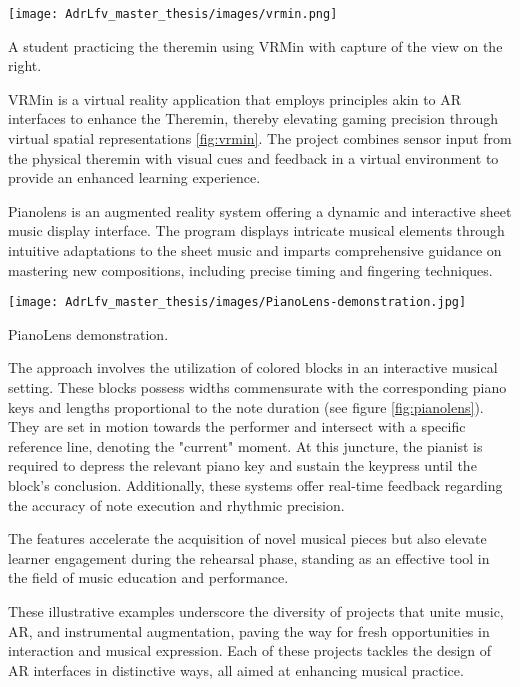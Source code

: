 \begin{marginfigure}
    \centering
    \texttt{[image: AdrLfv\_master\_thesis/images/vrmin.png]}
    \caption{A student practicing the theremin using VRMin with capture of the view on the right.}
    \label{fig:vrmin}
\end{marginfigure}

VRMin \cite{johnson2017vrmin} is a virtual reality application that employs principles akin to AR interfaces to enhance the Theremin, thereby elevating gaming precision through virtual spatial representations \ref{fig:vrmin}. The project combines sensor input from the physical theremin with visual cues and feedback in a virtual environment to provide an enhanced learning experience. 

Pianolens is an augmented reality system offering a dynamic and interactive sheet music display interface. The program displays intricate musical elements through intuitive adaptations to the sheet music and imparts comprehensive guidance on mastering new compositions, including precise timing and fingering techniques. 

\begin{marginfigure}
    \centering
    \texttt{[image: AdrLfv\_master\_thesis/images/PianoLens-demonstration.jpg]}
    \caption{PianoLens demonstration.}
    \label{fig:pianolens}
\end{marginfigure}

The approach involves the utilization of colored blocks in an interactive musical setting. These blocks possess widths commensurate with the corresponding piano keys and lengths proportional to the note duration (see figure \ref{fig:pianolens}). They are set in motion towards the performer and intersect with a specific reference line, denoting the "current" moment. At this juncture, the pianist is required to depress the relevant piano key and sustain the keypress until the block's conclusion. Additionally, these systems offer real-time feedback regarding the accuracy of note execution and rhythmic precision.

The features accelerate the acquisition of novel musical pieces but also elevate learner engagement during the rehearsal phase, standing as an effective tool in the field of music education and performance.

These illustrative examples underscore the diversity of projects that unite music, AR, and instrumental augmentation, paving the way for fresh opportunities in interaction and musical expression. Each of these projects tackles the design of AR interfaces in distinctive ways, all aimed at enhancing musical practice.


